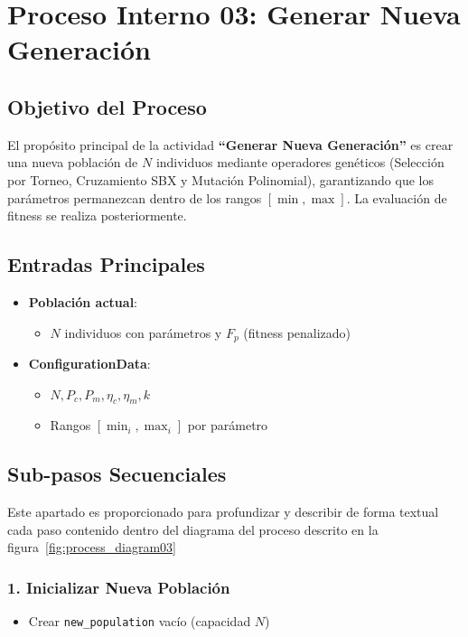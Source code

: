 \section{Proceso Interno 03: Generar Nueva Generación}

\subsection*{Objetivo del Proceso}
El propósito principal de la actividad \textbf{``Generar Nueva Generación''} es crear una nueva población de $N$ individuos mediante operadores genéticos (Selección por Torneo, Cruzamiento SBX y Mutación Polinomial), garantizando que los parámetros permanezcan dentro de los rangos $[\min, \max]$. La evaluación de fitness se realiza posteriormente.

\subsection*{Entradas Principales}
\begin{itemize}
    \item \textbf{Población actual}:
    \begin{itemize}
        \item $N$ individuos con parámetros y $F_p$ (fitness penalizado)
    \end{itemize}
    \item \textbf{ConfigurationData}:
    \begin{itemize}
        \item $N, P_c, P_m, \eta_c, \eta_m, k$
        \item Rangos $[\min_i, \max_i]$ por parámetro
    \end{itemize}
\end{itemize}

\subsection*{Sub-pasos Secuenciales}
Este apartado es proporcionado para profundizar y describir de forma textual cada paso contenido dentro del diagrama del proceso descrito en la figura~\ref{fig:process_diagram03}
\subsubsection*{1. Inicializar Nueva Población}
\begin{itemize}
    \item Crear \texttt{new\_population} vacío (capacidad $N$)
\end{itemize}

